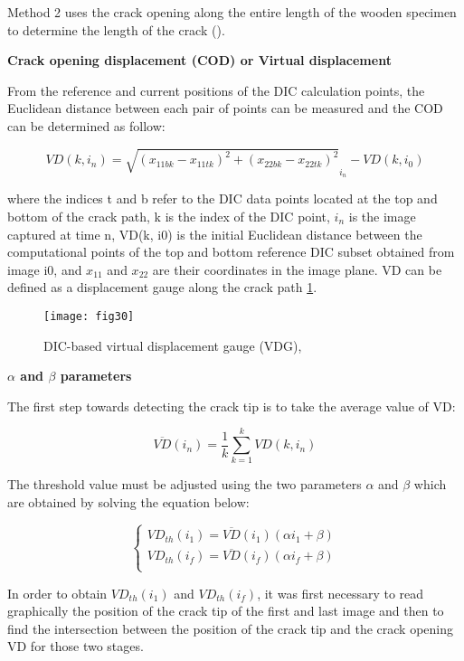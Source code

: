 Method 2 uses the crack opening along the entire length of the wooden specimen to determine the length of the crack (\cite{FilhoJ2022}). 

\textbf{Crack opening displacement (COD) or Virtual displacement}

From the reference and current positions of the DIC calculation points, the Euclidean distance between each pair of points can be measured and the COD can be determined as follow:

\begin{equation}
	VD(k,i_n)=\sqrt{(x_{11bk}-x_{11tk})^2 + (x_{22bk}-x_{22tk})^2}_{i_n} - VD(k,i_0)
\end{equation}

where the indices t and b refer to the DIC data points located at the top and bottom of the crack path, k is the index of the DIC point, $i_n$ is the image captured at time n, VD(k, i0) is the initial Euclidean distance between the computational points of the top and bottom reference DIC subset obtained from image i0, and $x_{11}$ and $x_{22}$ are their coordinates in the image plane. VD can be defined as a displacement gauge along the crack path \ref{fig:fig30}.

\begin{figure}[htp]
	\centering
	\texttt{[image: fig30]}
	\caption{DIC-based virtual displacement gauge (VDG), \cite{FilhoJ2022}}
	\label{fig:fig30}
\end{figure}

\textbf{$\alpha$ and $\beta$ parameters}

The first step towards detecting the crack tip is to take the average value of VD:

\begin{equation}
	\overline{VD}(i_n)=\frac{1}{k} \sum_{k=1}^{k}VD(k,i_n)
\end{equation}

The threshold value must be adjusted using the two parameters $\alpha$ and $\beta$ which are obtained by solving the equation below:

\begin{equation}
	\begin{cases}
		VD_{th}(i_1)=\overline{VD}(i_1)(\alpha i_1 +\beta)\\
		VD_{th}(i_f)=\overline{VD}(i_f)(\alpha i_f +\beta)\\ 
	\end{cases}
\end{equation}

In order to obtain $VD_{th}(i_1)$ and $VD_{th}(i_f)$, it was first necessary to read graphically the position of the crack tip of the first and last image and then to find the intersection between the position of the crack tip and the crack opening VD for those two stages.

